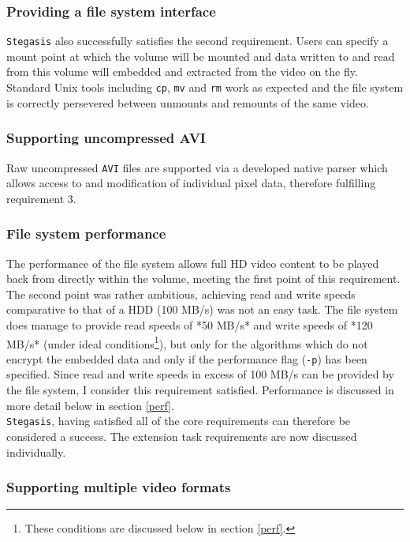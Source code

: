 \documentclass[paper=a4, fontsize=11pt,twoside]{scrartcl}    %
\numberwithin{table}{section}
\numberwithin{figure}{section}
\numberwithin{algorithm}{section}
\begin{document}
\subsubsection{Providing a file system interface}

\texttt{Stegasis} also successfully satisfies the second requirement. Users can specify a mount point at which the volume will be mounted and data written to and read from this volume will embedded and extracted from the video on the fly. Standard Unix tools including \texttt{cp}, \texttt{mv} and \texttt{rm} work as expected and the file system is correctly persevered between unmounts and remounts of the same video.

\subsubsection{Supporting uncompressed AVI}

Raw uncompressed \texttt{AVI} files are supported via a developed native parser which allows access to and modification of individual pixel data, therefore fulfilling requirement 3.

\subsubsection{File system performance}

The performance of the file system allows full HD video content to be played back from directly within the volume, meeting the first point of this requirement. The second point was rather ambitious, achieving read and write speeds comparative to that of a HDD (100 MB/s) was not an easy task. The file system does manage to provide read speeds of *50 MB/s* and write speeds of *120 MB/s* (under ideal conditions\footnote{These conditions are discussed below in section \ref{perf}.}), but only for the algorithms which do not encrypt the embedded data and only if the performance flag (\texttt{-p}) has been specified. Since read and write speeds in excess of 100 MB/s can be provided by the file system, I consider this requirement satisfied. Performance is discussed in more detail below in section \ref{perf}.\\

\noindent
\texttt{Stegasis}, having satisfied all of the core requirements can therefore be considered a success. The extension task requirements are now discussed individually. 

\subsubsection{Supporting multiple video formats}
\end{document}
